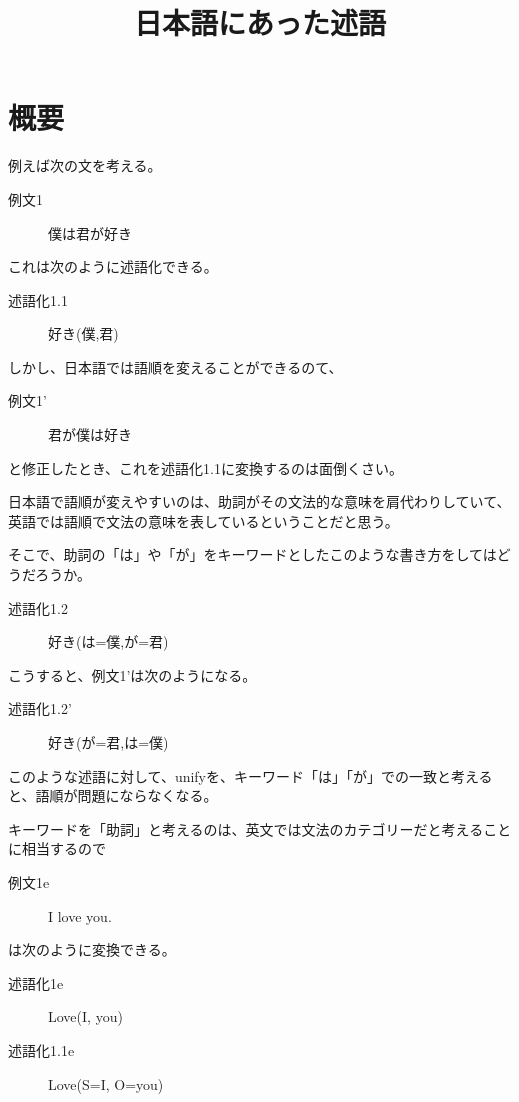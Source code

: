 \documentclass[10pt, oneside]{jarticle}   	%
\title{日本語にあった述語}
\author{\myname}
\begin{document}
\maketitle

\section{概要}
例えば次の文を考える。
\begin{description}
\item[ 例文1] 僕は君が好き
\end{description}

これは次のように述語化できる。
\begin{description}
\item[ 述語化1.1] 好き(僕,君)
\end{description}

しかし、日本語では語順を変えることができるのて、
\begin{description}
\item[ 例文1'] 君が僕は好き
\end{description}
と修正したとき、これを述語化1.1に変換するのは面倒くさい。

日本語で語順が変えやすいのは、助詞がその文法的な意味を肩代わりしていて、
英語では語順で文法の意味を表しているということだと思う。



そこで、助詞の「は」や「が」をキーワードとしたこのような書き方をしてはどうだろうか。
\begin{description}
\item[ 述語化1.2] 好き(は=僕,が=君)
\end{description}
こうすると、例文1'は次のようになる。
\begin{description}
\item[ 述語化1.2'] 好き(が=君,は=僕)
\end{description}

このような述語に対して、unifyを、キーワード「は」「が」での一致と考えると、語順が問題にならなくなる。

キーワードを「助詞」と考えるのは、英文では文法のカテゴリーだと考えることに相当するので
\begin{description}
\item[ 例文1e] I love you.
\end{description}

は次のように変換できる。
\begin{description}
\item[ 述語化1e] Love(I, you)
\item[ 述語化1.1e] Love(S=I, O=you)
\end{description}
\end{document}
